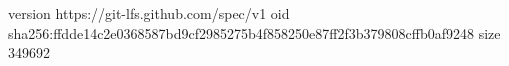 version https://git-lfs.github.com/spec/v1
oid sha256:ffdde14c2e0368587bd9cf2985275b4f858250e87ff2f3b379808cffb0af9248
size 349692

